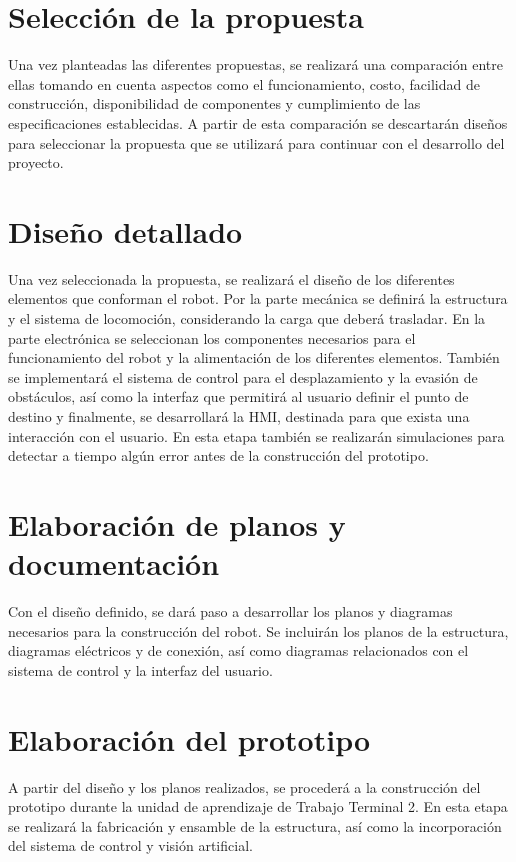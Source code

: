 \section{Selección de la propuesta}
\label{sec:propuesta}

Una vez planteadas las diferentes propuestas, se realizará una comparación entre ellas tomando en cuenta aspectos como el funcionamiento, costo, facilidad de construcción, disponibilidad de componentes y cumplimiento de las especificaciones establecidas. A partir de esta comparación se descartarán diseños para seleccionar la propuesta que se utilizará para continuar con el desarrollo del proyecto.

\section{Diseño detallado}
\label{sec:diseño_detallado}
Una vez seleccionada la propuesta, se realizará el diseño de los diferentes elementos que conforman el robot. Por la parte mecánica se definirá la estructura y el sistema de locomoción, considerando la carga que deberá trasladar. En la parte electrónica se seleccionan los componentes necesarios para el funcionamiento del robot y la alimentación de los diferentes elementos. También se  implementará el sistema de control para el desplazamiento y la evasión de obstáculos, así como la interfaz que permitirá al usuario definir el punto de destino y finalmente, se desarrollará la HMI, destinada para que exista una interacción con el usuario. En esta etapa también se realizarán simulaciones para detectar a tiempo algún error antes de la construcción del prototipo.

\section{Elaboración de planos y documentación}
\label{sec:Planos_documentacion}
Con el diseño definido, se dará paso a desarrollar los planos y diagramas necesarios para la construcción del robot. Se incluirán los planos de la estructura, diagramas eléctricos y de conexión, así como diagramas relacionados con el sistema de control y la interfaz del usuario.

\section{Elaboración del prototipo}
\label{sec:Elab_prototipo}

A partir del diseño y los planos realizados, se procederá a la construcción del prototipo durante la unidad de aprendizaje de Trabajo Terminal 2. En esta etapa se realizará la fabricación y ensamble de la estructura, así como la incorporación del sistema de control y visión artificial.


